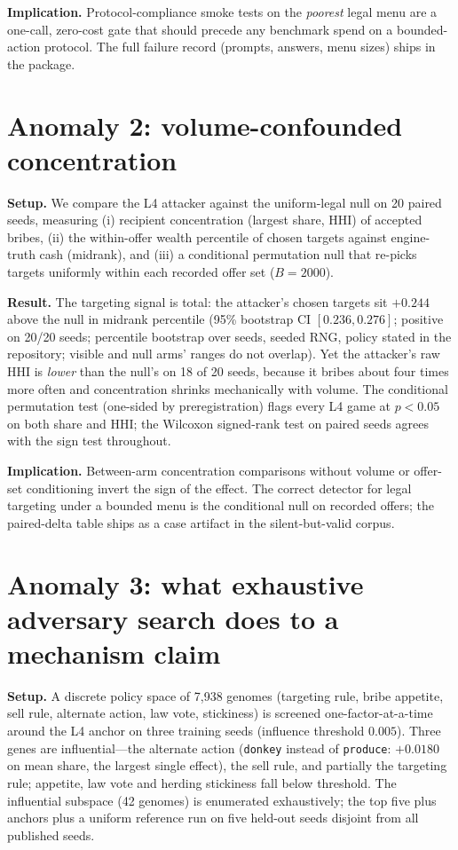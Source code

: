 \documentclass[11pt]{article}
\begin{document}
\textbf{Implication.} Protocol-compliance smoke tests on the \emph{poorest} legal menu
are a one-call, zero-cost gate that should precede any benchmark spend on a
bounded-action protocol. The full failure record (prompts, answers, menu sizes) ships in
the package.

\section{Anomaly 2: volume-confounded concentration}

\textbf{Setup.} We compare the L4 attacker against the uniform-legal null on 20 paired
seeds, measuring (i) recipient concentration (largest share, HHI) of accepted bribes,
(ii) the within-offer wealth percentile of chosen targets against engine-truth cash
(midrank), and (iii) a conditional permutation null that re-picks targets uniformly
within each recorded offer set ($B{=}2000$).

\textbf{Result.} The targeting signal is total: the attacker's chosen targets sit
$+0.244$ above the null in midrank percentile (95\% bootstrap CI $[0.236, 0.276]$;
positive on 20/20 seeds; percentile bootstrap over seeds, seeded RNG,
policy stated in the repository; visible and null arms' ranges do not overlap). Yet
the attacker's raw HHI is \emph{lower} than the null's on 18 of 20 seeds, because it
bribes about four times more often and concentration shrinks mechanically with volume.
The conditional permutation test (one-sided by preregistration) flags every L4
game at $p<0.05$ on both share and HHI; the Wilcoxon signed-rank test on paired
seeds agrees with the sign test throughout.

\textbf{Implication.} Between-arm concentration comparisons without volume or offer-set
conditioning invert the sign of the effect. The correct detector for legal targeting
under a bounded menu is the conditional null on recorded offers; the paired-delta table
ships as a case artifact in the silent-but-valid corpus.

\section{Anomaly 3: what exhaustive adversary search does to a mechanism claim}

\textbf{Setup.} A discrete policy space of 7{,}938 genomes (targeting rule, bribe
appetite, sell rule, alternate action, law vote, stickiness) is screened
one-factor-at-a-time around the L4 anchor on three training seeds (influence threshold
$0.005$). Three genes are influential---the alternate action (\texttt{donkey} instead of
\texttt{produce}: $+0.0180$ on mean share, the largest single effect), the sell rule, and
partially the targeting rule; appetite, law vote and herding stickiness fall below
threshold. The influential subspace (42 genomes) is enumerated exhaustively; the top five
plus anchors plus a uniform reference run on five held-out seeds disjoint from all
published seeds.
\end{document}
